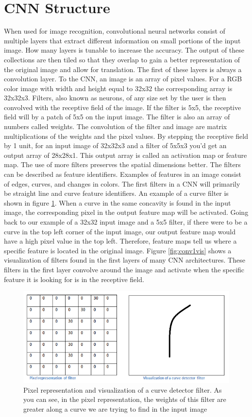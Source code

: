 \section{CNN Structure}
When used for image recognition, convolutional neural networks consist of multiple layers that extract different information on small portions of the input image. How many layers is tunable to increase the accuracy. The output of these collections are then tiled so that they overlap to gain a better representation of the original image and allow for translation. The first of these layers is always a convolution layer. To the CNN, an image is an array of pixel values. For a RGB color image with width and height equal to 32x32 the corresponding array is 32x32x3. Filters, also known as neurons, of any size set by the user is then convolved with the receptive field of the image. If the filter is 5x5, the receptive field will by a patch of 5x5 on the input image. The filter is also an array of numbers called weights. The convolution of the filter and image are matrix multiplications of the weights and the pixel values. By stepping the receptive field by 1 unit, for an input image of 32x32x3 and a filter of 5x5x3 you'd get an output array of 28x28x1. This output array is called an activation map or feature map. The use of more filters preserves the spatial dimensions better. The filters can be described as feature identifiers. Examples of features in an image consist of edges, curves, and changes in colors. The first filters in a CNN will primarily be straight line and curve feature identifiers. An example of a curve filter is shown in figure \ref{fig:curvedetector}. When a curve in the same concavity is found in the input image, the corresponding pixel in the output feature map will be activated. Going back to our example of a 32x32 input image and a 5x5 filter, if there were to be a curve in the top left corner of the input image, our output feature map would have a high pixel value in the top left. Therefore, feature maps tell us where a specific feature is located in the original image. Figure \ref{fig:conv1vis} shows a visualization of filters found in the first layers of many CNN architectures. These filters in the first layer convolve around the image and activate when the specific feature it is looking for is in the receptive field. 
\begin{figure}[htp!]
\centering
\includegraphics[width=.6\textwidth]{figs/curvedetector.png}
\caption{Pixel representation and visualization of a curve detector filter. As you can see, in the pixel representation, the weights of this filter are greater along a curve we are trying to find in the input image}
\label{fig:curvedetector}
\end{figure} 

